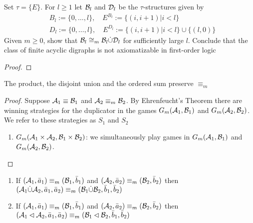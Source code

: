 \documentclass[11pt]{article}
\begin{document}
\begin{exercise}
\label{ex2.3.9}
Set \(\tau=\{E\}\). For \(l\ge1\) let \(\mathcal{B}_l\) and \(\mathcal{D}_l\) be the \(\tau\)-structures
given by
   \begin{align*}
&B_l:=\{0,\dots,l\},\quad E^{B_l}:=\{(i,i+1)|i<l\}\\
&D_l:=\{0,\dots,l\},\quad E^{D_l}:=\{(i,i+1)|i<l\}\cup\{(l,0)\}
   \end{align*}
Given \(m\ge0\), show that \(\mathcal{B}_l\cong_m\mathcal{B}_l\dot\cup\mathcal{D}_l\) for sufficiently large \(l\).
Conclude that the class of finite acyclic digraphs is not axiomatizable in first-order logic
\end{exercise}

\begin{proof}

\end{proof}

\begin{proposition}[]
The product, the disjoint union and the ordered sum preserve \(\equiv_m\)
\end{proposition}

\begin{proof}
Suppose \(\mathcal{A}_1\equiv\mathcal{B}_1\) and \(\mathcal{A}_2\equiv_m\mathcal{B}_2\). By Ehrenfeucht's Theorem there
are winning strategies for the duplicator in the games \(G_m(\mathcal{A}_1,\mathcal{B}_1)\)
and \(G_m(\mathcal{A}_2,\mathcal{B}_2)\). We refer to these strategies as \(S_1\) and \(S_2\)
\begin{enumerate}
\item \(G_m(\mathcal{A}_1\times\mathcal{A}_2,\mathcal{B}_1\times\mathcal{B}_2)\): we simultaneously play games
in \(G_m(\mathcal{A}_1,\mathcal{B}_1)\) and \(G_m(\mathcal{A}_2,\mathcal{B}_2)\).
\end{enumerate}
\end{proof}

\begin{corollary}[]
\begin{enumerate}
\item If \((\mathcal{A}_1,\bar{a}_1)\equiv_m(\mathcal{B}_1,\bar{b}_1)\)
and \((\mathcal{A}_2,\bar{a}_2)\equiv_m(\mathcal{B}_2,\bar{b}_2)\) then
\((\mathcal{A}_1\dot\cup\mathcal{A}_2,\bar{a}_1,\bar{a}_2)\equiv_m(\mathcal{B}_1\dot\cup\mathcal{B}_2,\bar{b}_1,\bar{b}_2)\)
\item If \((\mathcal{A}_1,\bar{a}_1)\equiv_m(\mathcal{B}_1,\bar{b}_1)\)
and \((\mathcal{A}_2,\bar{a}_2)\equiv_m(\mathcal{B}_2,\bar{b}_2)\) then
\((\mathcal{A}_1\lhd\mathcal{A}_2,\bar{a}_1,\bar{a}_2)\equiv_m(\mathcal{B}_1\lhd\mathcal{B}_2,\bar{b}_1,\bar{b}_2)\)
\end{enumerate}
\end{corollary}
\end{document}
